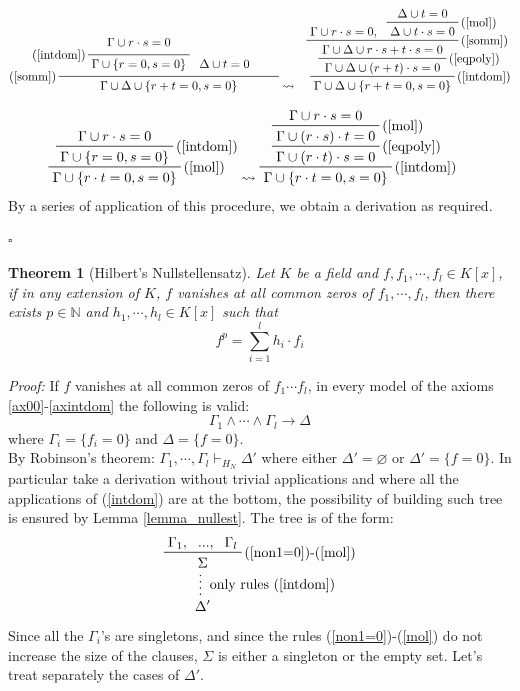 \documentclass[a4paper,12pt,oneside]{book}
\newtheorem{theorem}{Theorem}[chapter]
\newcommand*{\QED}{\hfill\ensuremath{\square}}
\let\emptyset\varnothing
\let\e\wedge
\begin{document}
\begin{eqnarray*}
\prfrulenameskip=0.4em\prflinepadbefore=1ex
\prftree[l]{(\ref{somm})} { \prftree[l]{(\ref{intdom})} { \Gamma \cup  r\cdot s=0} { \Gamma \cup \{ r=0,s=0\} }  }{ \Delta \cup t=0 }
{\hspace{11mm}\Gamma \cup \Delta \cup\{r+t=0, s=0\}\hspace{11mm}}
& \leadsto
& \prftree[r]{(\ref{intdom})} 
{\prftree[r]{(\ref{eqpoly})}
{ 
\prftree[r]{(\ref{somm})}{\Gamma \cup r\cdot s=0,} 
{ \prftree[r]{(\ref{mol})} {\Delta \cup t=0  }  {\Delta \cup t\cdot s=0 }}
{\Gamma \cup \Delta \cup r\cdot s+t\cdot s=0 }
}
{\Gamma \cup \Delta \cup (r+t)\cdot s=0 }
}
{\Gamma \cup \Delta \cup\{r+t=0, s=0\}}
\end{eqnarray*}


\begin{eqnarray*}
\prftree[r]{(\ref{mol})} { \prftree[r]{(\ref{intdom})} {\Gamma \cup  r\cdot s=0} {\Gamma \cup  \{r=0, s=0\}} } {\Gamma \cup \{r\cdot t=0, s=0\}}
&  \leadsto 
\prftree[r]{(\ref{intdom})} 
{ \prftree[r]{(\ref{eqpoly})} 
{\prftree[r]{(\ref{mol})}
{\Gamma \cup r\cdot s=0}
{\Gamma\cup (r\cdot s) \cdot t=0 } } 
{\Gamma \cup  (r\cdot t) \cdot s=0} } 
{\Gamma \cup \{r\cdot t=0, s=0\}}
\end{eqnarray*}
By a series of application of this procedure, we obtain a derivation as required. 

\QED

\begin{theorem}[Hilbert's Nullstellensatz]
Let $K$ be a field and $f,f_1,\cdots, f_l \in K[{x}]$, if in any extension of $K$, $f$ vanishes at all common zeros of $f_1,\cdots, f_l$, then there exists $p\in \mathbb{N}$ and $h_1,\cdots, h_l \in K[{x}]$ such that
$$
f^p = \sum_{i=1}^l h_i \cdot f_i
$$
\end{theorem}
\newpage
\textit{Proof: }If $f$ vanishes at all common zeros of $f_1\cdots f_l$, in every model of the axioms \ref{ax00}-\ref{axintdom} the following is valid:
$$ \Gamma_1\e\cdots\e\Gamma_l\rightarrow\Delta$$
where $\Gamma_i=\{f_i=0\}$ and $\Delta =\{f=0\}$.\\ By Robinson's theorem: $\Gamma_1,\cdots ,\Gamma_l \vdash_{H_N} \Delta '$ where either $\Delta '=\emptyset$ or $\Delta '=\{f=0\}$. 
In particular take a derivation without trivial applications and where all the applications of (\ref{intdom}) are at the bottom, the possibility of building such tree is ensured by Lemma \ref{lemma_nullest}. The tree is of the form:
\begin{equation*}
\prfsummary[only rules (\ref{intdom})] {\prftree[r]{(\ref{non1=0})-(\ref{mol})}{\Gamma_1,}{...,}{\Gamma_l}{\Sigma}}{\Delta '}
\end{equation*}
Since all the $\Gamma_i$'s are singletons, and since the rules (\ref{non1=0})-(\ref{mol}) do not increase the size of the clauses, $\Sigma$ is either a singleton or the empty set. Let's treat separately the cases of $\Delta '$.
\end{document}
